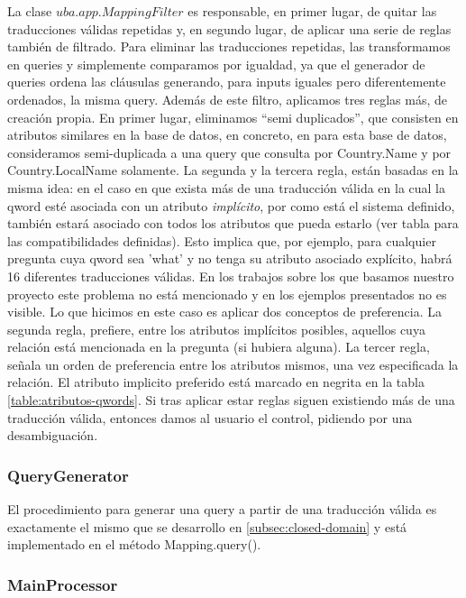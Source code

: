 La clase $uba.app.MappingFilter$ es responsable, en primer lugar, de quitar las traducciones válidas repetidas y, en segundo lugar, de aplicar una serie de reglas también de filtrado. Para eliminar las traducciones repetidas, las transformamos en queries y simplemente comparamos por igualdad, ya que el generador de queries ordena las cláusulas generando, para inputs iguales pero diferentemente ordenados, la misma query.
Además de este filtro, aplicamos tres reglas más, de creación propia. En primer lugar, eliminamos ``semi duplicados'', que consisten en atributos similares en la base de datos, en concreto, en para esta base de datos, consideramos semi-duplicada a una query que consulta por Country.Name y por Country.LocalName solamente. La segunda y la tercera regla, están basadas en la misma idea: en el caso en que exista más de una traducción válida en la cual la qword esté asociada con un atributo \textit{implícito}, por como está el sistema definido, también estará asociado con todos los atributos que pueda estarlo (ver tabla  para las compatibilidades definidas). Esto implica que, por ejemplo, para cualquier pregunta cuya qword sea 'what' y no tenga su atributo asociado explícito, habrá 16 diferentes traducciones válidas. En los trabajos sobre los que basamos nuestro proyecto este problema no está mencionado y en los ejemplos presentados no es visible. Lo que hicimos en este caso es aplicar dos conceptos de preferencia. La segunda regla, prefiere, entre los atributos implícitos posibles, aquellos cuya relación está mencionada en la pregunta (si hubiera alguna). La tercer regla, señala un orden de preferencia entre los atributos mismos, una vez especificada la relación. El atributo implicito preferido está marcado en negrita en la tabla \ref{table:atributos-qwords}. Si tras aplicar estar reglas siguen existiendo más de una traducción válida, entonces damos al usuario el control, pidiendo por una desambiguación.


\subsubsection*{QueryGenerator}
\label{subsubsec:query-generator}

El procedimiento para generar una query a partir de una traducción válida es exactamente el mismo que se desarrollo en \ref{subsec:closed-domain} y está implementado en el método Mapping.query().


\subsubsection*{MainProcessor}
\label{subsubsec:main-processor}

